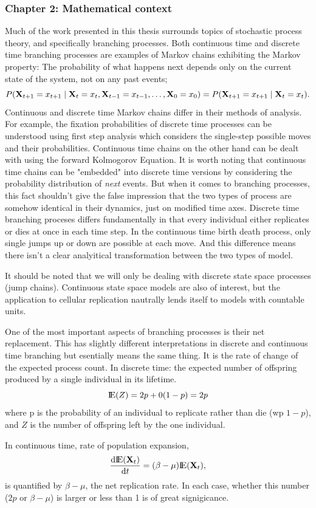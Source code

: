 \subsubsection{Chapter 2: Mathematical context}




Much of the work presented in this thesis surrounds topics of stochastic process theory,  and specifically branching processes.  Both continuous time and discrete time branching processes are examples of Markov chains exhibiting the Markov property: The probability of what happens next depends only on the current state of the system,   not on any past events;
\[
P({\bf X}_{t+1} = x_{t+1} \mid {\bf X}_t = x_t, {\bf X}_{t-1} = x_{t-1}, \ldots, {\bf X}_0 = x_0) = P({\bf X}_{t+1} = x_{t+1} \mid {\bf X}_t = x_t).
\] 
Continuous and discrete time Markov chains differ in their methods of analysis.  For example,  the fixation probabilities of discrete time processes can be understood using first step analysis which considers the single-step possible moves and their probabilities.  Continuous time chains on the other hand can be dealt with using the forward Kolmogorov Equation.  It is worth noting that continuous time chains can be "embedded" into discrete time versions by considering the probability distribution of \textit{next} events.  But when it comes to branching processes,  this fact shouldn't give the false impression that the two types of process are somehow identical in their dynamics,  just on modified time axes. Discrete time branching proceses differs fundamentally in that every individual either replicates or dies at once in each time step.  In the continuous time birth death process,  only single jumps up or down are possible at each move.  And this difference means there isn't a clear analyitical transformation between the two types of model.\par
It should be noted that we will only be dealing with discrete state space processes (jump chains).  Continuous state space models are also of interest, but the application to cellular replication nautrally lends itself to models with countable units. 
\vspace{10pt}

\noindent
One of the most important aspects of branching processes is their net replacement. This has slightly different interpretations in discrete and continuous time branching but esentially means the same thing.  It is the rate of change of the expected process count.  In discrete time: the expected number of offspring produced by a single individual in its lifetime.  
$${\rm I}\!{\rm E}(Z) = 2 p + 0(1-p) = 2p$$  
where p is the probability of an individual to replicate rather than die (wp $1-p$), and $Z$ is the number of offspring left by the one individual. \par 
In continuous time,  rate of population expansion,
$$\displaystyle\frac{{\rm d} {\rm I}\!{\rm E}({{\bf X}_t})}{{\rm d} t} = (\beta - \mu) {\rm I}\!{\rm E}({{\bf X}_t}),$$
is quantified by $\beta - \mu$,  the net replication rate. 
In each case,  whether this number ($2p$ or $\beta - \mu$) is larger or less than 1 is of great signigicance. 




